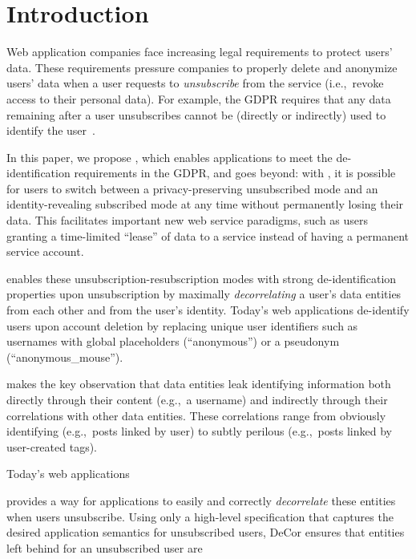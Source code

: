 \section{Introduction}

Web application companies face increasing legal requirements to protect users’ data. These
requirements pressure companies to properly delete and anonymize users' data when a user requests to
\emph{unsubscribe} from the service (i.e.,\ revoke access to their personal data). For example, the
GDPR requires that any data remaining after a user unsubscribes cannot be (directly or
indirectly) used to identify the user~\cite{gdpr}.  

In this paper, we propose \sys{}, which enables applications to meet the de-identification
requirements in the GDPR, and goes beyond: with \sys{}, it is possible for users to switch between a
privacy-preserving unsubscribed mode and an identity-revealing subscribed mode at any time without
permanently losing their data. This facilitates important new web service paradigms,
such as users granting a time-limited ``lease'' of data to a service instead of having a permanent
service account.

\sys{} enables these unsubscription-resubscription modes with strong de-identification properties
upon unsubscription by maximally \emph{decorrelating} a user's data entities from each other and
from the user's identity.
Today's web applications de-identify users upon account deletion by replacing unique user
identifiers such as usernames with global placeholders (``anonymous'') or a pseudonym
(``anonymous\_mouse'').

\sys{} makes the key observation that data entities leak identifying information both directly
through their content (e.g.,\ a username) and indirectly through their correlations with other data
entities. These correlations range from obviously identifying (e.g.,\ posts linked by user)
to subtly perilous (e.g.,\ posts linked by user-created tags). 


Today's web applications 

\sys{} provides a
way for applications to easily and correctly \emph{decorrelate} these entities when users
unsubscribe. Using only a high-level specification that captures the desired application semantics
for unsubscribed users, DeCor ensures that entities left behind for an unsubscribed user are

